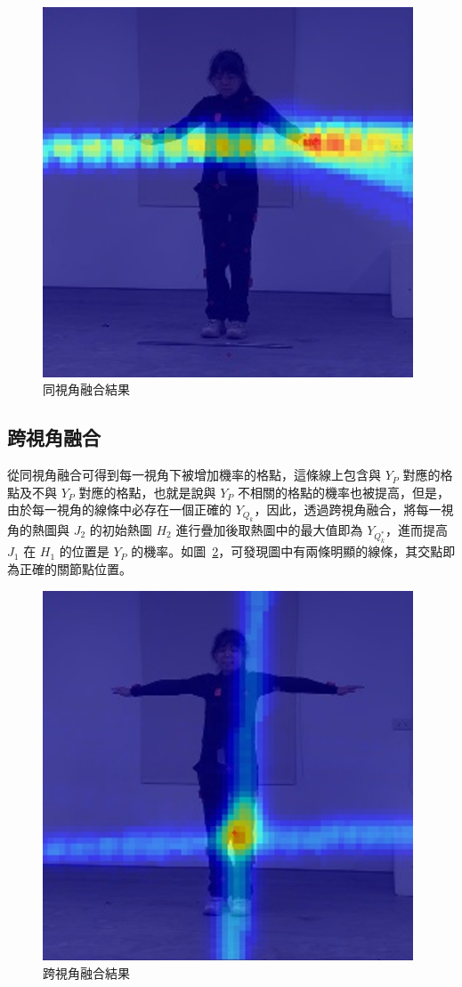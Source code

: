 \begin{figure}[!ht]
   \centering
   \includegraphics[width=11cm]{figure/ch3_fig_same_view.png}
    \caption[同視角融合結果]{同視角融合結果}
    \label{ch3_fig_same_view}
\end{figure}

\subsection{跨視角融合}
從同視角融合可得到每一視角下被增加機率的格點，這條線上包含與 $Y_P$ 對應的格點及不與 $Y_P$ 對應的格點，也就是說與 $Y_P$ 不相關的格點的機率也被提高，但是，由於每一視角的線條中必存在一個正確的 $Y_{Q_k}$，因此，透過跨視角融合，將每一視角的熱圖與 $J_2$ 的初始熱圖 $H_2$ 進行疊加後取熱圖中的最大值即為 $Y_{Q_k^*}$，進而提高 $J_1$ 在 $H_1$ 的位置是 $Y_P$ 的機率。如圖~\ref{ch3_fig_cross_view}，可發現圖中有兩條明顯的線條，其交點即為正確的關節點位置。

\begin{figure}[!ht]
   \centering
   \includegraphics[width=11cm]{figure/ch3_fig_cross_view.png}
    \caption[跨視角融合結果]{跨視角融合結果}
    \label{ch3_fig_cross_view}
\end{figure}

